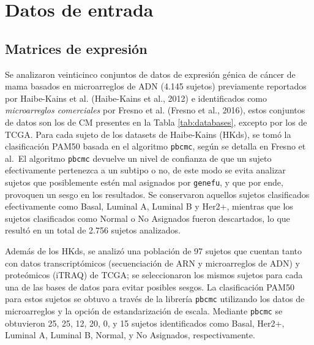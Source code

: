 \documentclass[12pt,twoside]{reedthesis}
\begin{document}
\hypertarget{datos-de-entrada-1}{%
\section{Datos de entrada}\label{datos-de-entrada-1}}

\hypertarget{matrices-de-expresion-1}{%
\subsection{Matrices de expresión}\label{matrices-de-expresion-1}}

\par

Se analizaron veinticinco conjuntos de datos de expresión génica de cáncer de mama basados en microarreglos de ADN (4.145 sujetos) previamente reportados por Haibe-Kains et al. (Haibe-Kains et al., 2012) e identificados como \emph{microarreglos comerciales} por Fresno et al. (Fresno et al., 2016), estos conjuntos de datos son los de CM presentes en la Tabla \ref{tab:databases}, excepto por los de TCGA. Para cada sujeto de los datasets de Haibe-Kains (HKds), se tomó la clasificación PAM50 basada en el algoritmo \texttt{pbcmc}, según se detalla en Fresno et al.~El algoritmo \texttt{pbcmc} devuelve un nivel de confianza de que un sujeto efectivamente pertenezca a un subtipo o no, de este modo se evita analizar sujetos que posiblemente estén mal asignados por \texttt{genefu}, y que por ende, provoquen un sesgo en los resultados. Se conservaron aquellos sujetos clasificados efectivamente como Basal, Luminal A, Luminal B y Her2+, mientras que los sujetos clasificados como Normal o No Asignados fueron descartados, lo que resultó en un total de 2.756 sujetos analizados.

\par

Además de los HKds, se analizó una población de 97 sujetos que cuentan tanto con datos transcriptómicos (secuenciación de ARN y microarreglos de ADN) y proteómicos (iTRAQ) de TCGA; se seleccionaron los mismos sujetos para cada una de las bases de datos para evitar posibles sesgos. La clasificación PAM50 para estos sujetos se obtuvo a través de la librería \texttt{pbcmc} utilizando los datos de microarreglos y la opción de estandarización de escala. Mediante \texttt{pbcmc} se obtuvieron 25, 25, 12, 20, 0, y 15 sujetos identificados como Basal, Her2+, Luminal A, Luminal B, Normal, y No Asignados, respectivamente.

\par
\end{document}
